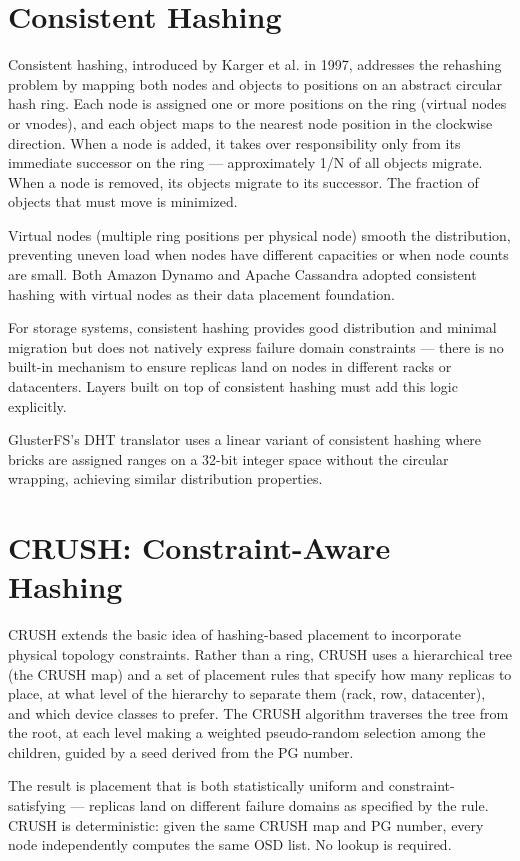 \section{Consistent Hashing}
Consistent hashing, introduced by Karger et al. in 1997, addresses the rehashing problem by mapping both nodes and objects to positions on an abstract circular hash ring. Each node is assigned one or more positions on the ring (virtual nodes or vnodes), and each object maps to the nearest node position in the clockwise direction. When a node is added, it takes over responsibility only from its immediate successor on the ring --- approximately 1/N of all objects migrate. When a node is removed, its objects migrate to its successor. The fraction of objects that must move is minimized.

Virtual nodes (multiple ring positions per physical node) smooth the distribution, preventing uneven load when nodes have different capacities or when node counts are small. Both Amazon Dynamo and Apache Cassandra adopted consistent hashing with virtual nodes as their data placement foundation.

For storage systems, consistent hashing provides good distribution and minimal migration but does not natively express failure domain constraints --- there is no built-in mechanism to ensure replicas land on nodes in different racks or datacenters. Layers built on top of consistent hashing must add this logic explicitly.

GlusterFS's DHT translator uses a linear variant of consistent hashing where bricks are assigned ranges on a 32-bit integer space without the circular wrapping, achieving similar distribution properties.

\section{CRUSH: Constraint-Aware Hashing}
CRUSH extends the basic idea of hashing-based placement to incorporate physical topology constraints. Rather than a ring, CRUSH uses a hierarchical tree (the CRUSH map) and a set of placement rules that specify how many replicas to place, at what level of the hierarchy to separate them (rack, row, datacenter), and which device classes to prefer. The CRUSH algorithm traverses the tree from the root, at each level making a weighted pseudo-random selection among the children, guided by a seed derived from the PG number.

The result is placement that is both statistically uniform and constraint-satisfying --- replicas land on different failure domains as specified by the rule. CRUSH is deterministic: given the same CRUSH map and PG number, every node independently computes the same OSD list. No lookup is required.

